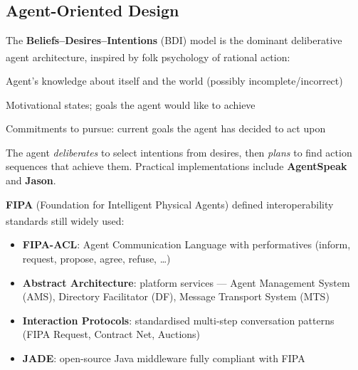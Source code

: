 \subsection{Agent-Oriented Design}
\begin{tcbitemize}[ skin=sectionraster ]

    \tcbitem[title=BDI Architecture, raster multicolumn=3]
    The \textbf{Beliefs--Desires--Intentions} (BDI) model is the dominant
    deliberative agent architecture, inspired by folk psychology of rational
    action:\textsuperscript{\cite[][p.~73]{wooldridgeIntroductionMultiAgentSystems2009}}
    \begin{description}[leftmargin=0.6cm, labelindent=0pt]
        \item[\textbf{Beliefs}] Agent's knowledge about itself and the world (possibly incomplete/incorrect)
        \item[\textbf{Desires}] Motivational states; goals the agent would like to achieve
        \item[\textbf{Intentions}] Commitments to pursue: current goals the agent has decided to act upon
    \end{description}
    The agent \emph{deliberates} to select intentions from desires, then
    \emph{plans} to find action sequences that achieve them.
    Practical implementations include \textbf{AgentSpeak} and \textbf{Jason}.

    \tcbitem[title=FIPA Standards, raster multicolumn=3]
    \textbf{FIPA} (Foundation for Intelligent Physical Agents) defined
    interoperability standards still widely used:\textsuperscript{\cite[][Ch.~2]{bellifeministeDevelopingMultiAgentSystems2007}}
    \begin{itemize}
        \item \textbf{FIPA-ACL}: Agent Communication Language with performatives
              (inform, request, propose, agree, refuse, \ldots)
        \item \textbf{Abstract Architecture}: platform services — Agent Management
              System (AMS), Directory Facilitator (DF), Message Transport System (MTS)
        \item \textbf{Interaction Protocols}: standardised multi-step conversation patterns
              (FIPA Request, Contract Net, Auctions)
        \item \textbf{JADE}: open-source Java middleware fully compliant with FIPA
    \end{itemize}


\end{tcbitemize}
